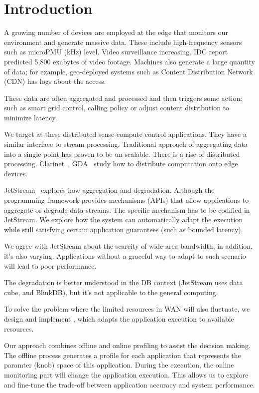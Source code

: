 \section{Introduction}
\label{sec:introduction}

A growing number of devices are employed at the edge that monitors our
environment and generate massive data. These include high-frequency sensors such
as microPMU (kHz) level. Video surveillance increasing. IDC
report~\cite{gantz2012digital} predicted 5,800 exabytes of video
footage. Machines also generate a large quantity of data; for example,
geo-deployed systems such as Content Distribution Network (CDN) has logs about
the access.

These data are often aggregated and processed and then triggers some action:
such as smart grid control, calling policy or adjust content distribution to
minimize latency.

We target at these distributed sense-compute-control applications. They have a
similar interface to stream processing. Traditional approach of aggregating data
into a single point has proven to be un-scalable. There is a rise of distributed
processing. Clarinet~\cite{viswanathan2016clarinet}, GDA~\cite{pu2015low} study
how to distribute computation onto edge devices.

JetStream~\cite{rabkin2014aggregation} explores how aggregation and degradation.
Although the programming framework provides mechanisms (APIs) that allow
applications to aggregate or degrade data streams. The specific mechanism has to
be codified in JetStream. We explore how the system can automatically adapt the
execution while still satisfying certain application guarantees (such as bounded
latency).

We agree with JetStream about the scarcity of wide-area bandwidth; in addition,
it's also varying. Applications without a graceful way to adapt to such scenario
will lead to poor performance.

The degradation is better understood in the DB context (JetStream uses data
cube, and BlinkDB), but it's not applicable to the general computing.

To solve the problem where the limited resources in WAN will also fluctuate, we
design and implement \sysname{}, which adapts the application execution to
available resources.

Our approach combines offline and online profiling to assist the decision
making. The offline process generates a profile for each application that
represents the paramter (knob) space of this application. During the execution,
the online monitoring part will change the application execution. This allows us
to explore and fine-tune the trade-off between application accuracy and system
performance.

